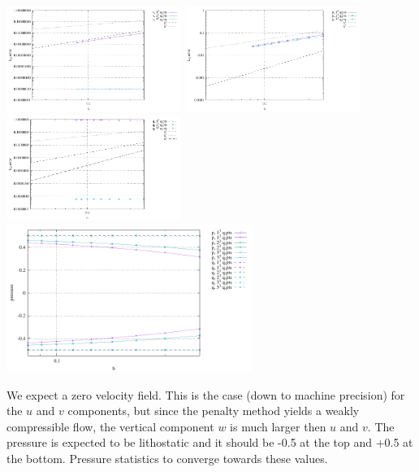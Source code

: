 \begin{center}
\includegraphics[width=5.7cm]{python_codes/fieldstone_10/resultsQ2/exp0/errv}
\includegraphics[width=5.7cm]{python_codes/fieldstone_10/resultsQ2/exp0/errp}
\includegraphics[width=5.7cm]{python_codes/fieldstone_10/resultsQ2/exp0/errq}\\
\includegraphics[width=8cm]{python_codes/fieldstone_10/resultsQ2/exp0/p_stats}
\end{center}

We expect a zero velocity field. This is the case (down to machine precision) 
for the $u$ and $v$ components, but since the penalty method yields a 
weakly compressible flow, the vertical component $w$ is much larger 
then $u$ and $v$.
The pressure is expected to be lithostatic and it should be -0.5 at the top 
and +0.5 at the bottom. Pressure statistics to converge towards these values. 

